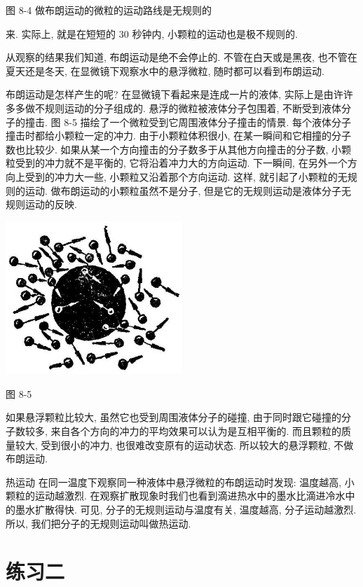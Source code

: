 \documentclass[10pt]{article}
\begin{document}
图 8-4 做布朗运动的微粒的运动路线是无规则的

来. 实际上, 就是在短短的 30 秒钟内, 小颗粒的运动也是极不规则的.

从观察的结果我们知道, 布朗运动是绝不会停止的. 不管在白天或是黑夜, 也不管在夏天还是冬天, 在显微镜下观察水中的悬浮微粒, 随时都可以看到布朗运动.

布朗运动是怎样产生的呢? 在显微镜下看起来是连成一片的液体, 实际上是由许许多多做不规则运动的分子组成的. 悬浮的微粒被液体分子包围着, 不断受到液体分子的撞击. 图 8-5 描绘了一个微粒受到它周围液体分子撞击的情景. 每个液体分子撞击时都给小颗粒一定的冲力. 由于小颗粒体积很小, 在某一瞬间和它相撞的分子数也比较少. 如果从某一个方向撞击的分子数多于从其他方向撞击的分子数, 小颗粒受到的冲力就不是平衡的, 它将沿着冲力大的方向运动. 下一瞬间, 在另外一个方向上受到的冲力大一些, 小颗粒又沿着那个方向运动. 这样, 就引起了小颗粒的无规则的运动. 做布朗运动的小颗粒虽然不是分子, 但是它的无规则运动是液体分子无规则运动的反映.

\begin{center}
\includegraphics[max width=0.5\textwidth]{images/01912d55-147c-70aa-b0e0-1782a122f948_238_558734.jpg}
\end{center}

图 8-5

如果悬浮颗粒比较大, 虽然它也受到周围液体分子的碰撞, 由于同时跟它碰撞的分子数较多, 来自各个方向的冲力的平均效果可以认为是互相平衡的. 而且颗粒的质量较大, 受到很小的冲力, 也很难改变原有的运动状态. 所以较大的悬浮颗粒, 不做布朗运动.

热运动 在同一温度下观察同一种液体中悬浮微粒的布朗运动时发现: 温度越高, 小颗粒的运动越激烈. 在观察扩散现象时我们也看到滴进热水中的墨水比滴进冷水中的墨水扩散得快. 可见, 分子的无规则运动与温度有关, 温度越高, 分子运动越激烈. 所以, 我们把分子的无规则运动叫做热运动.

\section*{练习二}
\end{document}
